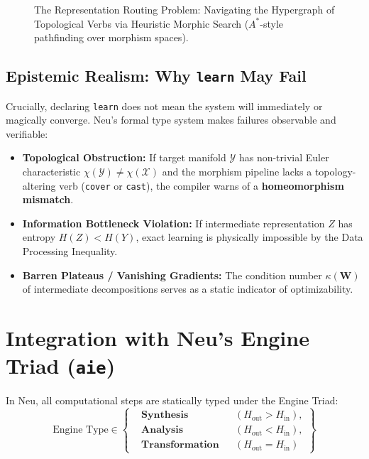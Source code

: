 \documentclass[11pt]{article}
\begin{document}
\begin{figure}[htbp]
\vspace{0.4em}
\caption{The Representation Routing Problem: Navigating the Hypergraph of Topological Verbs via Heuristic Morphic Search ($A^*$-style pathfinding over morphism spaces).}
\label{fig:representation_routing}
\end{figure}

\subsection{Epistemic Realism: Why \texttt{learn} May Fail}
Crucially, declaring \texttt{learn} does not mean the system will immediately or magically converge. Neu's formal type system makes failures observable and verifiable:
\begin{itemize}
    \item \textbf{Topological Obstruction:} If target manifold $\mathcal{Y}$ has non-trivial Euler characteristic $\chi(\mathcal{Y}) \ne \chi(\mathcal{X})$ and the morphism pipeline lacks a topology-altering verb (\texttt{cover} or \texttt{cast}), the compiler warns of a \textbf{homeomorphism mismatch}.
    \item \textbf{Information Bottleneck Violation:} If intermediate representation $Z$ has entropy $H(Z) < H(Y)$, exact learning is physically impossible by the Data Processing Inequality.
    \item \textbf{Barren Plateaus / Vanishing Gradients:} The condition number $\kappa(\mathbf{W})$ of intermediate decompositions serves as a static indicator of optimizability.
\end{itemize}

\section{Integration with Neu's Engine Triad (\texttt{aie})}

In Neu, all computational steps are statically typed under the Engine Triad:
\begin{equation}
\text{Engine Type} \in \left\{
\begin{aligned}
&\textbf{Synthesis} &&(H_{\text{out}} > H_{\text{in}}), \\
&\textbf{Analysis} &&(H_{\text{out}} < H_{\text{in}}), \\
&\textbf{Transformation} &&(H_{\text{out}} = H_{\text{in}})
\end{aligned}
\right\}
\end{equation}
\end{document}
